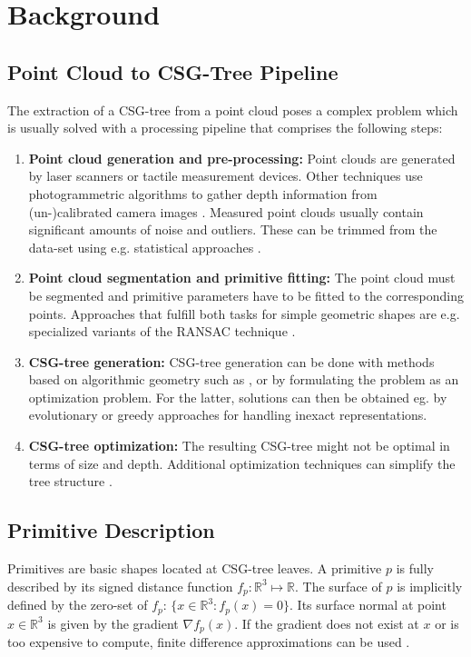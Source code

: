 \section{Background}
\label{sec:back}
\subsection{Point Cloud to \ac{CSG}-Tree Pipeline} 
The extraction of a \ac{CSG}-tree from a point cloud poses a complex problem which is usually solved with a processing pipeline that comprises the following steps:  
\begin{enumerate}
\item \textbf{Point cloud generation and pre-processing:} Point clouds are generated by laser scanners or tactile measurement devices. 
Other techniques use photogrammetric algorithms to gather depth information from (un-)calibrated camera images \cite{hartley2003multiple}.
Measured point clouds usually contain significant amounts of noise and outliers. 
These can be trimmed from the data-set using e.g. statistical approaches  \cite{rusu20113d}.
\item \textbf{Point cloud segmentation and primitive fitting:} The point cloud must be segmented and primitive parameters have to be fitted to the corresponding points. Approaches that fulfill both tasks for simple geometric shapes are e.g. specialized variants of the \ac{RANSAC} technique \cite{schnabel2007efficient}.
\item \textbf{\ac{CSG}-tree generation:} \ac{CSG}-tree generation can be done with methods based on algorithmic geometry such as \cite{shapiro1993separation, buchele2004three, andrews2013user}, or by formulating the problem as an optimization problem. 
For the latter, solutions can then be obtained eg. by evolutionary \cite{fayolle2016evolutionary} or greedy \cite{xiao2014} approaches for handling inexact representations.
\item \textbf {\ac{CSG}-tree optimization:} The resulting \ac{CSG}-tree might not be optimal in terms of size and depth.
Additional optimization techniques can simplify the tree structure \cite{shapiro1991construction}. 
\end{enumerate}
\subsection{Primitive Description}
Primitives are basic shapes located at \ac{CSG}-tree leaves. 
A primitive $p$ is fully described by its signed distance function $f_p: \mathbb{R}^3 \mapsto \mathbb{R}$.
The surface of $p$ is implicitly defined by the zero-set of $f_p$: $\{x \in \mathbb{R}^3 : f_p(x)=0\}$.
Its surface normal at point $x \in \mathbb{R}^3$ is given by the gradient $\nabla f_p(x)$.
If the gradient does not exist at $x$ or is too expensive to compute, finite difference approximations can be used \cite{olver2014introduction}.
